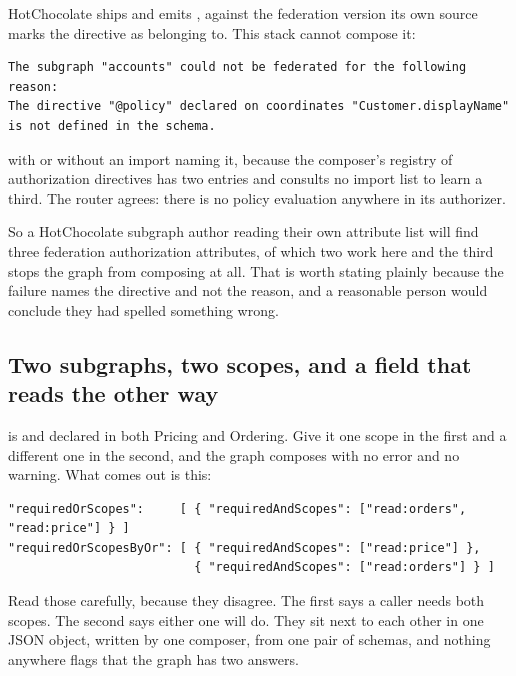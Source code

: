 %
HotChocolate ships \code{[Policy]} and emits , against the
federation version its own source marks the directive as belonging to. This
stack cannot compose it:

\begin{verbatim}
The subgraph "accounts" could not be federated for the following reason:
The directive "@policy" declared on coordinates "Customer.displayName"
is not defined in the schema.
\end{verbatim}

with or without an  import naming it, because the composer's
registry of authorization directives has two entries and consults no import
list to learn a third. The router agrees: there is no policy evaluation
anywhere in its authorizer.

So a HotChocolate subgraph author reading their own attribute list will find
three federation authorization attributes, of which two work here and the third
stops the graph from composing at all. That is worth stating plainly because
the failure names the directive and not the reason, and a reasonable person
would conclude they had spelled something wrong.

\subsection*{Two subgraphs, two scopes, and a field that reads the other way}

%
 is  and declared in both Pricing and
Ordering. Give it one scope in the first and a different one in the second,
and the graph composes with no error and no warning. What comes out is this:

\begin{verbatim}
"requiredOrScopes":     [ { "requiredAndScopes": ["read:orders", "read:price"] } ]
"requiredOrScopesByOr": [ { "requiredAndScopes": ["read:price"] },
                          { "requiredAndScopes": ["read:orders"] } ]
\end{verbatim}

Read those carefully, because they disagree. The first says a caller needs both
scopes. The second says either one will do. They sit next to each other in one
JSON object, written by one composer, from one pair of schemas, and nothing
anywhere flags that the graph has two answers.

